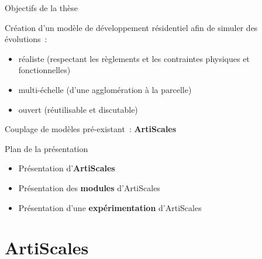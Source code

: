 \documentclass[xcolor=table]{beamer}
\begin{document}
\begin{frame}{Objectifs de la thèse}
		\begin{block}{}
		Création d'un modèle de développement résidentiel afin de simuler des évolutions~:
		\begin{itemize}
			\item réaliste (respectant les règlements et les contraintes physiques et fonctionnelles)
			\item multi-échelle (d'une agglomération à la parcelle)
			\item ouvert (réutilisable et discutable) %
		\end{itemize}
	\end{block}
	Couplage de modèles pré-existant~: \textbf{ArtiScales} 
\end{frame}








\begin{frame}{Plan de la présentation}
	\begin{itemize}
		\item Présentation d'\textbf{ArtiScales}
		\item Présentation des \textbf{modules} d'ArtiScales
		\item Présentation d'une \textbf{expérimentation} d'ArtiScales
	\end{itemize}
\end{frame}




\section{ArtiScales}
\end{document}
